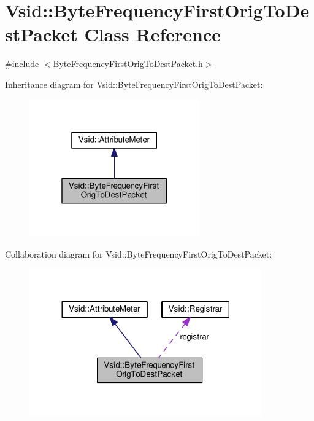 \hypertarget{class_vsid_1_1_byte_frequency_first_orig_to_dest_packet}{\section{Vsid\-:\-:Byte\-Frequency\-First\-Orig\-To\-Dest\-Packet Class Reference}
\label{class_vsid_1_1_byte_frequency_first_orig_to_dest_packet}
}


{\ttfamily \#include $<$Byte\-Frequency\-First\-Orig\-To\-Dest\-Packet.\-h$>$}



Inheritance diagram for Vsid\-:\-:Byte\-Frequency\-First\-Orig\-To\-Dest\-Packet\-:
\nopagebreak
\begin{figure}[H]
\begin{center}
\leavevmode
\includegraphics[width=208pt]{class_vsid_1_1_byte_frequency_first_orig_to_dest_packet__inherit__graph}
\end{center}
\end{figure}


Collaboration diagram for Vsid\-:\-:Byte\-Frequency\-First\-Orig\-To\-Dest\-Packet\-:
\nopagebreak
\begin{figure}[H]
\begin{center}
\leavevmode
\includegraphics[width=284pt]{class_vsid_1_1_byte_frequency_first_orig_to_dest_packet__coll__graph}
\end{center}
\end{figure}
